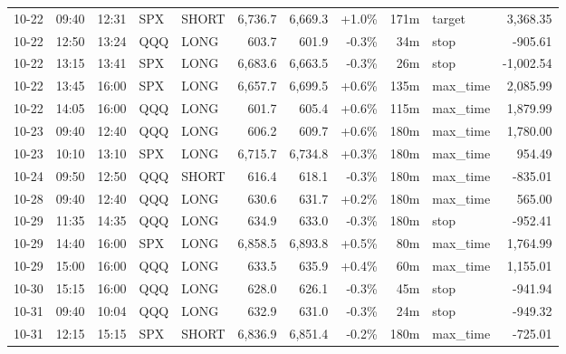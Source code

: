 \documentclass[11pt,a4paper,twoside]{article}
\begin{document}
\begin{center}
\begin{longtable}{>{\color{txtmain}}l l l l l r r r r >{\color{txtmain}}l r}
10-22 & 09:40 & 12:31 & SPX & SHORT & 6,736.7 & 6,669.3 & \textcolor{wingreen}{+1.0\%} & 171m & target & \textcolor{wingreen}{3,368.35} \\
10-22 & 12:50 & 13:24 & QQQ & LONG & 603.7 & 601.9 & \textcolor{lossred}{-0.3\%} & 34m & stop & \textcolor{lossred}{-905.61} \\
10-22 & 13:15 & 13:41 & SPX & LONG & 6,683.6 & 6,663.5 & \textcolor{lossred}{-0.3\%} & 26m & stop & \textcolor{lossred}{-1,002.54} \\
10-22 & 13:45 & 16:00 & SPX & LONG & 6,657.7 & 6,699.5 & \textcolor{wingreen}{+0.6\%} & 135m & max\_time & \textcolor{wingreen}{2,085.99} \\
10-22 & 14:05 & 16:00 & QQQ & LONG & 601.7 & 605.4 & \textcolor{wingreen}{+0.6\%} & 115m & max\_time & \textcolor{wingreen}{1,879.99} \\
10-23 & 09:40 & 12:40 & QQQ & LONG & 606.2 & 609.7 & \textcolor{wingreen}{+0.6\%} & 180m & max\_time & \textcolor{wingreen}{1,780.00} \\
10-23 & 10:10 & 13:10 & SPX & LONG & 6,715.7 & 6,734.8 & \textcolor{wingreen}{+0.3\%} & 180m & max\_time & \textcolor{wingreen}{954.49} \\
10-24 & 09:50 & 12:50 & QQQ & SHORT & 616.4 & 618.1 & \textcolor{lossred}{-0.3\%} & 180m & max\_time & \textcolor{lossred}{-835.01} \\
10-28 & 09:40 & 12:40 & QQQ & LONG & 630.6 & 631.7 & \textcolor{wingreen}{+0.2\%} & 180m & max\_time & \textcolor{wingreen}{565.00} \\
10-29 & 11:35 & 14:35 & QQQ & LONG & 634.9 & 633.0 & \textcolor{lossred}{-0.3\%} & 180m & stop & \textcolor{lossred}{-952.41} \\
10-29 & 14:40 & 16:00 & SPX & LONG & 6,858.5 & 6,893.8 & \textcolor{wingreen}{+0.5\%} & 80m & max\_time & \textcolor{wingreen}{1,764.99} \\
10-29 & 15:00 & 16:00 & QQQ & LONG & 633.5 & 635.9 & \textcolor{wingreen}{+0.4\%} & 60m & max\_time & \textcolor{wingreen}{1,155.01} \\
10-30 & 15:15 & 16:00 & QQQ & LONG & 628.0 & 626.1 & \textcolor{lossred}{-0.3\%} & 45m & stop & \textcolor{lossred}{-941.94} \\
10-31 & 09:40 & 10:04 & QQQ & LONG & 632.9 & 631.0 & \textcolor{lossred}{-0.3\%} & 24m & stop & \textcolor{lossred}{-949.32} \\
10-31 & 12:15 & 15:15 & SPX & SHORT & 6,836.9 & 6,851.4 & \textcolor{lossred}{-0.2\%} & 180m & max\_time & \textcolor{lossred}{-725.01} \\

\end{longtable}
\end{center}
\end{document}
